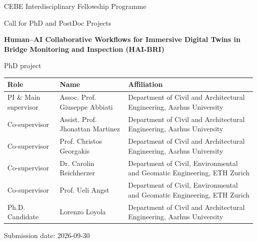 \documentclass[12pt,a4paper]{article}
\begin{document}
\begin{titlepage}
\centering
\vspace*{1.5cm}


{\large CEBE Interdisciplinary Fellowship Programme}\par
{\large Call for PhD and PostDoc Projects}\par
\vspace{1.5cm}

{\Huge\bfseries Human--AI Collaborative Workflows for Immersive Digital Twins in Bridge Monitoring and Inspection (HAI-BRI)}\par
\vspace{0.5cm}
{\large PhD project}\par

\vspace{2cm}

\begin{tabular}{@{}p{3.2cm}p{4.5cm}p{6.5cm}@{}}
\toprule
\textbf{Role} & \textbf{Name} & \textbf{Affiliation} \\
\midrule
PI \& Main supervisor & Assoc. Prof. Giuseppe Abbiati & Department of Civil and Architectural Engineering, Aarhus University \\
Co-supervisor & Assist. Prof.  Jhonattan Martinez & Department of Civil and Architectural Engineering, Aarhus University \\
Co-supervisor & Prof. Christos Georgakis & Department of Civil and Architectural Engineering, Aarhus University \\
Co-supervisor & Dr. Carolin Reichherzer & Department of Civil, Environmental and Geomatic Engineering, ETH Zurich \\
Co-supervisor & Prof. Ueli Angst & Department of Civil, Environmental and Geomatic Engineering, ETH Zurich \\
Ph.D. Candidate & Lorenzo Loyola & Department of Civil and Architectural Engineering, Aarhus University \\
\bottomrule
\end{tabular}

\vspace{2cm}
Submission date: 2026-09-30

\end{titlepage}
\end{document}
